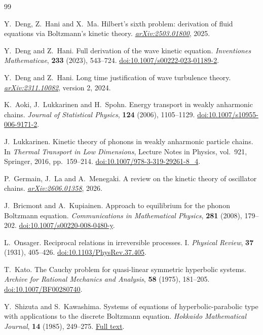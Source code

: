 \begin{thebibliography}{99}

Y.~Deng, Z.~Hani and X.~Ma.
\newblock Hilbert's sixth problem: derivation of fluid equations via Boltzmann's kinetic theory.
\newblock \href{https://arxiv.org/abs/2503.01800}{\emph{arXiv:2503.01800}}, 2025.

Y.~Deng and Z.~Hani.
\newblock Full derivation of the wave kinetic equation.
\newblock \emph{Inventiones Mathematicae}, \textbf{233} (2023), 543--724.
\newblock \href{https://doi.org/10.1007/s00222-023-01189-2}{doi:10.1007/s00222-023-01189-2}.

Y.~Deng and Z.~Hani.
\newblock Long time justification of wave turbulence theory.
\newblock \href{https://arxiv.org/abs/2311.10082}{\emph{arXiv:2311.10082}}, version 2, 2024.

K.~Aoki, J.~Lukkarinen and H.~Spohn.
\newblock Energy transport in weakly anharmonic chains.
\newblock \emph{Journal of Statistical Physics}, \textbf{124} (2006), 1105--1129.
\newblock \href{https://doi.org/10.1007/s10955-006-9171-2}{doi:10.1007/s10955-006-9171-2}.

J.~Lukkarinen.
\newblock Kinetic theory of phonons in weakly anharmonic particle chains.
\newblock In \emph{Thermal Transport in Low Dimensions},
Lecture Notes in Physics, vol.~921, Springer, 2016, pp.~159--214.
\newblock \href{https://doi.org/10.1007/978-3-319-29261-8_4}{doi:10.1007/978-3-319-29261-8\_4}.

P.~Germain, J.~La and A.~Menegaki.
\newblock A review on the kinetic theory of oscillator chains.
\newblock \href{https://arxiv.org/abs/2606.01358}{\emph{arXiv:2606.01358}}, 2026.

J.~Bricmont and A.~Kupiainen.
\newblock Approach to equilibrium for the phonon Boltzmann equation.
\newblock \emph{Communications in Mathematical Physics}, \textbf{281} (2008), 179--202.
\newblock \href{https://doi.org/10.1007/s00220-008-0480-y}{doi:10.1007/s00220-008-0480-y}.

L.~Onsager.
\newblock Reciprocal relations in irreversible processes. I.
\newblock \emph{Physical Review}, \textbf{37} (1931), 405--426.
\newblock \href{https://doi.org/10.1103/PhysRev.37.405}{doi:10.1103/PhysRev.37.405}.

T.~Kato.
\newblock The Cauchy problem for quasi-linear symmetric hyperbolic systems.
\newblock \emph{Archive for Rational Mechanics and Analysis}, \textbf{58} (1975), 181--205.
\newblock \href{https://doi.org/10.1007/BF00280740}{doi:10.1007/BF00280740}.

Y.~Shizuta and S.~Kawashima.
\newblock Systems of equations of hyperbolic-parabolic type with applications
to the discrete Boltzmann equation.
\newblock \emph{Hokkaido Mathematical Journal}, \textbf{14} (1985), 249--275.
\newblock \href{https://www.math.sci.hokudai.ac.jp/hmj/page/14-2/pdf/HMJ_14_2_1985_249-275.pdf}{Full text}.

\end{thebibliography}
